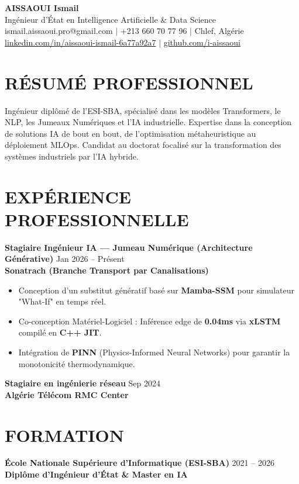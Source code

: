 \documentclass[a4paper,11pt]{article}
\begin{document}
\begin{center}
    {\Huge\bfseries\color{titleblue} AISSAOUI Ismail}\\[4pt]
    {\Large Ingénieur d'État en Intelligence Artificielle \& Data Science}\\[6pt]
    ismail.aissaoui.pro@gmail.com $|$ +213 660 70 77 96 $|$ Chlef, Algérie \\
    \href{https://linkedin.com/in/aissaoui-ismail-6a77a92a7}{linkedin.com/in/aissaoui-ismail-6a77a92a7} $|$ \href{https://github.com/i-aissaoui}{github.com/i-aissaoui}
\end{center}

\section{RÉSUMÉ PROFESSIONNEL}
Ingénieur diplômé de l'ESI-SBA, spécialisé dans les modèles Transformers, le NLP, les Jumeaux Numériques et l'IA industrielle. Expertise dans la conception de solutions IA de bout en bout, de l'optimisation métaheuristique au déploiement MLOps. Candidat au doctorat focalisé sur la transformation des systèmes industriels par l'IA hybride.

\section{EXPÉRIENCE PROFESSIONNELLE}
\textbf{Stagiaire Ingénieur IA — Jumeau Numérique (Architecture Générative)} \hfill Jan 2026 -- Présent \\
\textbf{Sonatrach (Branche Transport par Canalisations)} \\
\begin{itemize}
    \item Conception d'un substitut génératif basé sur \textbf{Mamba-SSM} pour simulateur "What-If" en temps réel.
    \item Co-conception Matériel-Logiciel : Inférence edge de \textbf{0.04ms} via \textbf{xLSTM} compilé en \textbf{C++ JIT}.
    \item Intégration de \textbf{PINN} (Physics-Informed Neural Networks) pour garantir la monotonicité thermodynamique.
\end{itemize}

\textbf{Stagiaire en ingénierie réseau} \hfill Sep 2024 \\
\textbf{Algérie Télécom RMC Center}

\section{FORMATION}
\textbf{École Nationale Supérieure d’Informatique (ESI-SBA)} \hfill 2021 -- 2026 \\
\textbf{Diplôme d'Ingénieur d'État \& Master en IA}
\end{document}
